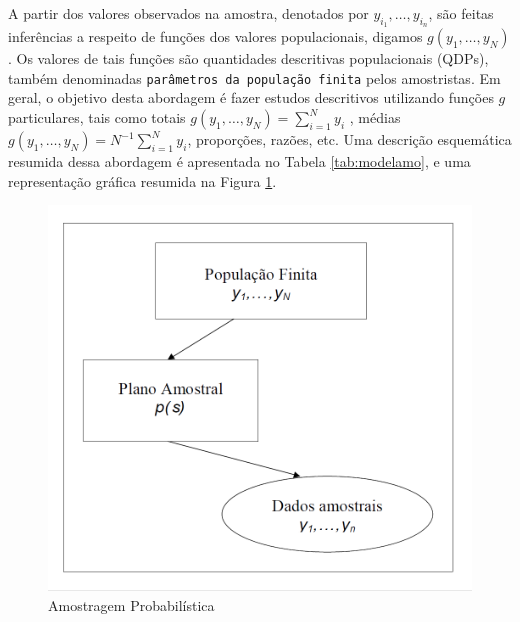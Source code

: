 \documentclass[]{book}
\theoremstyle{definition}
\theoremstyle{definition}
\theoremstyle{definition}
\theoremstyle{remark}
\begin{document}
A partir dos valores observados na amostra, denotados por
\(y_{i_{1}},\ldots,y_{i_{n}}\), são feitas inferências a respeito de
funções dos valores populacionais, digamos
\(g\left( y_{1},\ldots ,y_{N}\right)\). Os valores de tais funções são
quantidades descritivas populacionais (QDPs), também denominadas
\texttt{parâmetros\ da\ população\ finita} pelos amostristas. Em geral,
o objetivo desta abordagem é fazer estudos descritivos utilizando
funções \(g\) particulares, tais como totais
\(g\left( y_{1},\ldots ,y_{N}\right) =\sum_{i=1}^{N}y_{i}\) , médias
\(g\left( y_{1},\ldots ,y_{N}\right) =N^{-1}\sum_{i=1}^{N}y_{i}\),
proporções, razões, etc. Uma descrição esquemática resumida dessa
abordagem é apresentada no Tabela \ref{tab:modelamo}, e uma
representação gráfica resumida na Figura \ref{fig:modamo}.

\begin{figure}
\includegraphics[width=13.89in]{Figuras/fig22} \caption{Amostragem Probabilística}\label{fig:modamo}
\end{figure}
\end{document}
